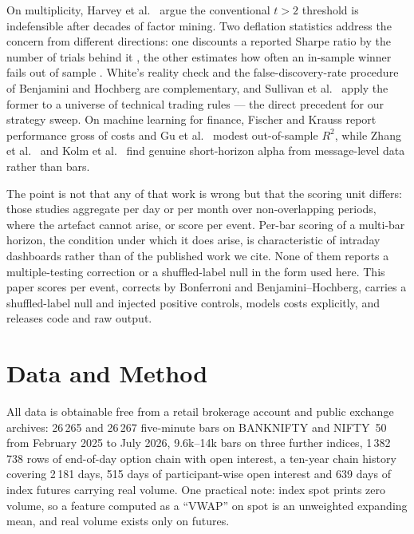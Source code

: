 \documentclass[runningheads]{llncs}
\begin{document}
On multiplicity, Harvey et al.\ \cite{harvey2016} argue the conventional $t>2$
threshold is indefensible after decades of factor mining. Two deflation
statistics address the concern from different directions: one discounts a
reported Sharpe ratio by the number of trials behind it \cite{bailey2014}, the
other estimates how often an in-sample winner fails out of sample
\cite{bailey2017}. White's reality check \cite{white2000} and the
false-discovery-rate procedure of Benjamini and Hochberg \cite{bh1995} are
complementary, and Sullivan et al.\ \cite{sullivan1999} apply the former to a
universe of technical trading rules --- the direct precedent for our strategy
sweep. On machine learning for finance, Fischer and Krauss \cite{fischer2018}
report performance gross of costs and Gu et al.\ \cite{gu2020} modest
out-of-sample $R^2$, while Zhang et al.\ \cite{zhang2019} and Kolm et al.\
\cite{kolm2023} find genuine short-horizon alpha from message-level data rather
than bars.

The point is not that any of that work is wrong but that the scoring unit
differs: those studies aggregate per day or per month over non-overlapping
periods, where the artefact cannot arise, or score per event. Per-bar scoring of
a multi-bar horizon, the condition under which it does arise, is characteristic
of intraday dashboards rather than of the published work we cite. None of them
reports a multiple-testing correction or a shuffled-label null in the form used
here. This paper scores per event, corrects by Bonferroni and
Benjamini--Hochberg, carries a shuffled-label null and injected positive
controls, models costs explicitly, and releases code and raw output.

\section{Data and Method}

All data is obtainable free from a retail brokerage account and public exchange
archives: 26\,265 and 26\,267 five-minute bars on BANKNIFTY and NIFTY~50 from
February 2025 to July 2026, 9.6k--14k bars on three further indices, 1\,382\,738
rows of end-of-day option chain with open interest, a ten-year chain history
covering 2\,181 days, 515 days of participant-wise open interest and 639 days of
index futures carrying real volume. One practical note: index spot prints zero
volume, so a feature computed as a ``VWAP'' on spot is an unweighted expanding
mean, and real volume exists only on futures.
\end{document}
